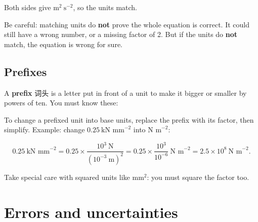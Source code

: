 \documentclass[11pt]{article}
\begin{document}
Both sides give $\text{m}^{2}\ \text{s}^{-2}$, so the units match.

Be careful: matching units do \textbf{not} prove the whole equation is correct. It could still have a wrong number, or a missing factor of 2. But if the units do \textbf{not} match, the equation is wrong for sure.

\subsection*{Prefixes}

A \textbf{prefix} 词头 is a letter put in front of a unit to make it bigger or smaller by powers of ten. You must know these:

\begin{center}
\end{center}

To change a prefixed unit into base units, replace the prefix with its factor, then simplify. Example: change $0.25\ \text{kN mm}^{-2}$ into $\text{N m}^{-2}$:

\[
0.25\ \text{kN mm}^{-2} = 0.25 \times \frac{10^{3}\ \text{N}}{(10^{-3}\ \text{m})^{2}} = 0.25 \times \frac{10^{3}}{10^{-6}}\ \text{N m}^{-2} = 2.5 \times 10^{8}\ \text{N m}^{-2}.
\]

Take special care with squared units like $\text{mm}^{2}$: you must square the factor too.

\section*{Errors and uncertainties}
\end{document}
